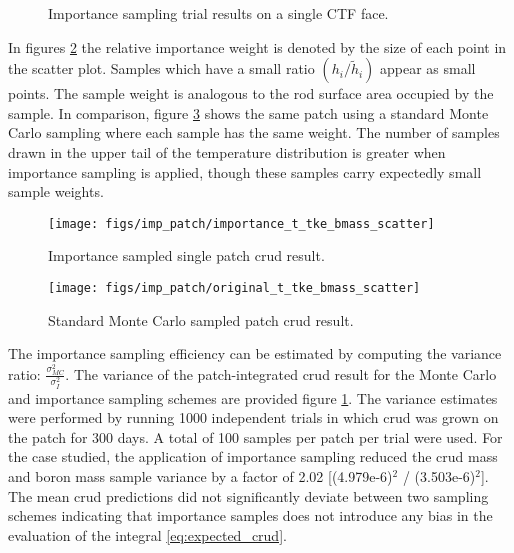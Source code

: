 \begin{figure}[H]%
    \centering
    \qquad
    \caption[]{Importance sampling trial results on a single CTF face.}%
    \label{fig:imp_sample1}%
\end{figure}

In figures \ref{fig:importancettkebmassscatter} the relative importance weight is denoted by the size of each point in the scatter plot.  Samples which have a small ratio $(h_i/\tilde h_i)$ appear as small points.  The sample weight is analogous to the rod surface area occupied by the sample.  In comparison, figure \ref{fig:originalttkebmassscatter} shows the same patch using a standard Monte Carlo sampling where each sample has the same weight.  The number of samples drawn in the upper tail of the temperature distribution is greater when importance sampling is applied, though these samples carry expectedly small sample weights.

\begin{figure}[H]
    \centering
    \texttt{[image: figs/imp\_patch/importance\_t\_tke\_bmass\_scatter]}
    \caption[Importance sampled single patch crud result.]{Importance sampled single patch crud result.}
    \label{fig:importancettkebmassscatter}
\end{figure}

\begin{figure}[H]
    \centering
    \texttt{[image: figs/imp\_patch/original\_t\_tke\_bmass\_scatter]}
    \caption[Standard Monte Carlo sampled patch crud result.]{Standard Monte Carlo sampled patch crud result.}
    \label{fig:originalttkebmassscatter}
\end{figure}

The importance sampling efficiency can be estimated by computing the variance ratio:  $\frac{\sigma^2_{MC}}{\sigma^2_{I}}$.  The variance of the patch-integrated crud result for the Monte Carlo and importance sampling schemes are provided figure \ref{fig:imp_sample1}.  The variance estimates were performed by running 1000 independent trials in which crud was grown on the patch for 300 days.  A total of 100 samples per patch per trial were used.  For the case studied, the application of importance sampling reduced the crud mass and boron mass sample variance by a factor of 2.02 [(4.979e-6)$^2$ / (3.503e-6)$^2$].  The mean crud predictions did not significantly deviate between two sampling schemes indicating that importance samples does not introduce any bias in the evaluation of the integral \ref{eq:expected_crud}.

